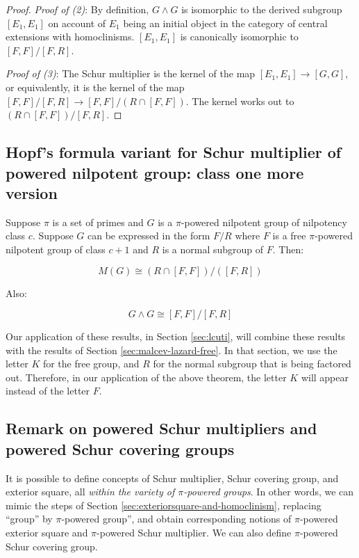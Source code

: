 \begin{proof}
  {\em Proof of (2)}: By definition, $G \wedge G$ is isomorphic to the
  derived subgroup $[E_1,E_1]$ on account of $E_1$ being an initial
  object in the category of central extensions with
  homoclinisms. $[E_1,E_1]$ is canonically isomorphic to
  $[F,F]/[F,R]$.

  {\em Proof of (3)}: The Schur multiplier is the kernel of the map
  $[E_1,E_1] \to [G,G]$, or equivalently, it is the kernel of the map
  $[F,F]/[F,R] \to [F,F]/(R \cap [F,F])$. The kernel works out to $(R
  \cap [F,F])/[F,R]$.
\end{proof}


\subsection{Hopf's formula variant for Schur multiplier of powered nilpotent group: class one more version}\label{sec:hopf-formula-pi-powered-class-one-more}

Suppose $\pi$ is a set of primes and $G$ is a $\pi$-powered nilpotent
group of nilpotency class $c$. Suppose $G$ can be expressed in the
form $F/R$ where $F$ is a free $\pi$-powered nilpotent group of class
$c + 1$ and $R$ is a normal subgroup of $F$. Then:

\begin{equation}\label{eq:pi-powered-hopf-formula-class-one-more}
  M(G) \cong (R \cap [F,F])/([F,R])
\end{equation}

Also:

\begin{equation}\label{eq:pi-powered-exteriorsquare-hopf-formula-class-one-more}
  G \wedge G \cong [F,F]/[F,R]
\end{equation}

Our application of these results, in Section \ref{sec:lcuti}, will
combine these results with the results of Section
\ref{sec:malcev-lazard-free}. In that section, we use the letter $K$
for the free group, and $R$ for the normal subgroup that is being
factored out. Therefore, in our application of the above theorem, the
letter $K$ will appear instead of the letter $F$.

\subsection{Remark on powered Schur multipliers and powered Schur covering groups}

It is possible to define concepts of Schur multiplier, Schur covering
group, and exterior square, all {\em within the variety of
  $\pi$-powered groups}. In other words, we can mimic the steps of
Section \ref{sec:exteriorsquare-and-homoclinism}, replacing ``group''
by $\pi$-powered group'', and obtain corresponding notions of
$\pi$-powered exterior square and $\pi$-powered Schur multiplier. We
can also define $\pi$-powered Schur covering group.

